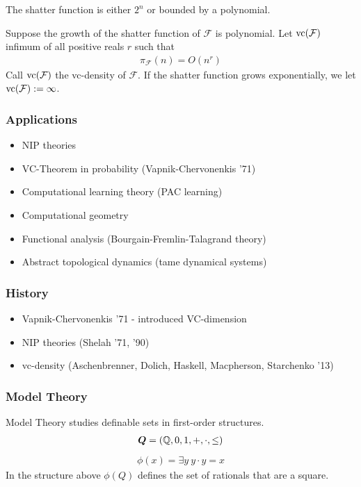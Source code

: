 \documentclass{beamer}
\newcommand{\F}{\mathcal F}
\begin{document}
\begin{frame}
	\begin{Theorem} 
		The shatter function is either $2^n$ or bounded by a polynomial.
	\end{Theorem}
	\begin{Definition}
		Suppose the growth of the shatter function of $\F$ is polynomial.
		Let $\vc(\F)$ infimum of all positive reals $r$ such that
		\begin{align*}
			\pi_\F(n) = O(n^r)
		\end{align*}
		Call $\vc(\F)$ the vc-density of $\F$.
		If the shatter function grows exponentially, we let $\vc(\F) := \infty$.
	\end{Definition}
\end{frame}

\begin{frame}
	\frametitle{Applications}
	\begin{itemize}
		\item NIP theories
		\item VC-Theorem in probability (Vapnik-Chervonenkis '71)
		\item Computational learning theory (PAC learning)
		\item Computational geometry
		\item Functional analysis (Bourgain-Fremlin-Talagrand theory)
		\item Abstract topological dynamics (tame dynamical systems)
	\end{itemize}
\end{frame}

\begin{frame}
	\frametitle{History}
	\begin{itemize}
		\item Vapnik-Chervonenkis '71 - introduced VC-dimension
		\item NIP theories (Shelah '71, '90)
		\item vc-density (Aschenbrenner, Dolich, Haskell, Macpherson, Starchenko '13)
	\end{itemize}
\end{frame}

\begin{frame}
	\frametitle{Model Theory}
	Model Theory studies definable sets in first-order structures.
	\begin{align*}
		\boldsymbol Q = (\mathbb{Q}, 0, 1, +, \cdot, \leq)
	\end{align*}
	\begin{align*}
		\phi(x) = \exists y \ y \cdot y = x
	\end{align*}
	In the structure above $\phi(Q)$ defines the set of rationals that are a square.
\end{frame}
\end{document}
